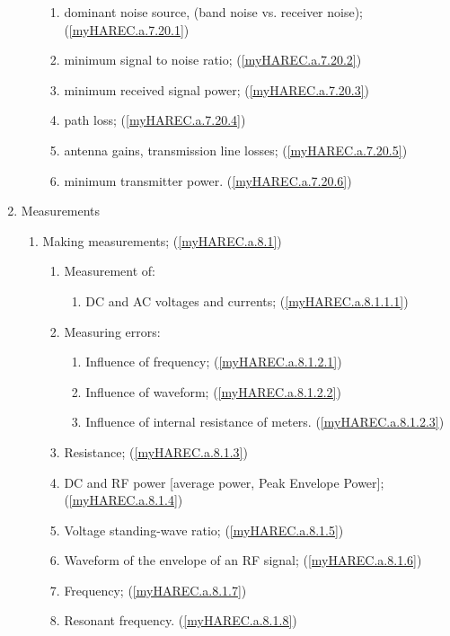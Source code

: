 \begin{enumerate}
\begin{enumerate}
\begin{enumerate}
\item dominant noise source, (band noise vs. receiver noise);
  (\ref{myHAREC.a.7.20.1})\label{HAREC.a.7.20.1}
\item minimum signal to noise ratio;
  (\ref{myHAREC.a.7.20.2})\label{HAREC.a.7.20.2}
\item minimum received signal power;
  (\ref{myHAREC.a.7.20.3})\label{HAREC.a.7.20.3}
\item path loss;
  (\ref{myHAREC.a.7.20.4})\label{HAREC.a.7.20.4}
\item antenna gains, transmission line losses;
  (\ref{myHAREC.a.7.20.5})\label{HAREC.a.7.20.5}
\item minimum transmitter power.
  (\ref{myHAREC.a.7.20.6})\label{HAREC.a.7.20.6}
\end{enumerate}
\end{enumerate}

\item Measurements
\begin{enumerate}

\item Making measurements; (\ref{myHAREC.a.8.1})\label{HAREC.a.8.1}
\begin{enumerate}
\item Measurement of:
\begin{enumerate}
\item DC and AC voltages and currents;
  (\ref{myHAREC.a.8.1.1.1})\label{HAREC.a.8.1.1.1}
\end{enumerate}
\item Measuring errors:
\begin{enumerate}
\item Influence of frequency; (\ref{myHAREC.a.8.1.2.1})\label{HAREC.a.8.1.2.1}
\item Influence of waveform; (\ref{myHAREC.a.8.1.2.2})\label{HAREC.a.8.1.2.2}
\item Influence of internal resistance of meters.
  (\ref{myHAREC.a.8.1.2.3})\label{HAREC.a.8.1.2.3}
\end{enumerate}
\item Resistance; (\ref{myHAREC.a.8.1.3})\label{HAREC.a.8.1.3}
\item DC and RF power [average power, Peak Envelope Power];
  (\ref{myHAREC.a.8.1.4})\label{HAREC.a.8.1.4}
\item Voltage standing-wave ratio; (\ref{myHAREC.a.8.1.5})\label{HAREC.a.8.1.5}
\item Waveform of the envelope of an RF signal;
  (\ref{myHAREC.a.8.1.6})\label{HAREC.a.8.1.6}
\item Frequency; (\ref{myHAREC.a.8.1.7})\label{HAREC.a.8.1.7}
\item Resonant frequency. (\ref{myHAREC.a.8.1.8})\label{HAREC.a.8.1.8}
\end{enumerate}


\end{enumerate}
\end{enumerate}
